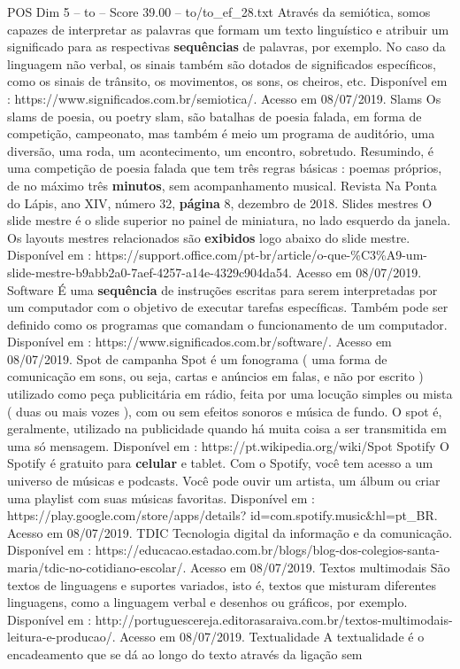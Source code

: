\begin{textsample}{POS Dim 5 – to – Score 39.00 – to/to\_ef\_28.txt}
Através da semiótica, somos capazes de interpretar as palavras que formam um texto linguístico e atribuir um significado para as respectivas \textbf{sequências} de palavras, por exemplo.
No caso da linguagem não verbal, os sinais também são dotados de significados específicos, como os sinais de trânsito, os movimentos, os sons, os cheiros, etc.
Disponível em : https://www.significados.com.br/semiotica/.
Acesso em 08/07/2019.
Slams Os slams de poesia, ou poetry slam, são batalhas de poesia falada, em forma de competição, campeonato, mas também é meio um programa de auditório, uma diversão, uma roda, um acontecimento, um encontro, sobretudo.
Resumindo, é uma competição de poesia falada que tem três regras básicas : poemas próprios, de no máximo três \textbf{minutos}, sem acompanhamento musical.
Revista Na Ponta do Lápis, ano XIV, número 32, \textbf{página} 8, dezembro de 2018.
Slides mestres O slide mestre é o slide superior no painel de miniatura, no lado esquerdo da janela.
Os layouts mestres relacionados são \textbf{exibidos} logo abaixo do slide mestre.
Disponível em : https://support.office.com/pt-br/article/o-que-\%C3\%A9-um-slide-mestre-b9abb2a0-7aef-4257-a14e-4329c904da54.
Acesso em 08/07/2019.
Software É uma \textbf{sequência} de instruções escritas para serem interpretadas por um computador com o objetivo de executar tarefas específicas.
Também pode ser definido como os programas que comandam o funcionamento de um computador.
Disponível em : https://www.significados.com.br/software/.
Acesso em 08/07/2019.
Spot de campanha Spot é um fonograma ( uma forma de comunicação em sons, ou seja, cartas e anúncios em falas, e não por escrito ) utilizado como peça publicitária em rádio, feita por uma locução simples ou mista ( duas ou mais vozes ), com ou sem efeitos sonoros e música de fundo.
O spot é, geralmente, utilizado na publicidade quando há muita coisa a ser transmitida em uma só mensagem.
Disponível em : https://pt.wikipedia.org/wiki/Spot Spotify O Spotify é gratuito para \textbf{celular} e tablet.
Com o Spotify, você tem acesso a um universo de músicas e podcasts.
Você pode ouvir um artista, um álbum ou criar uma playlist com suas músicas favoritas.
Disponível em : https://play.google.com/store/apps/details? id=com.spotify.music\&hl=pt\_BR.
Acesso em 08/07/2019.
TDIC Tecnologia digital da informação e da comunicação.
Disponível em : https://educacao.estadao.com.br/blogs/blog-dos-colegios-santa-maria/tdic-no-cotidiano-escolar/.
Acesso em 08/07/2019.
Textos multimodais São textos de linguagens e suportes variados, isto é, textos que misturam diferentes linguagens, como a linguagem verbal e desenhos ou gráficos, por exemplo.
Disponível em : http://portuguescereja.editorasaraiva.com.br/textos-multimodais-leitura-e-producao/.
Acesso em 08/07/2019.
Textualidade A textualidade é o encadeamento que se dá ao longo do texto através da ligação sem


\end{textsample}
